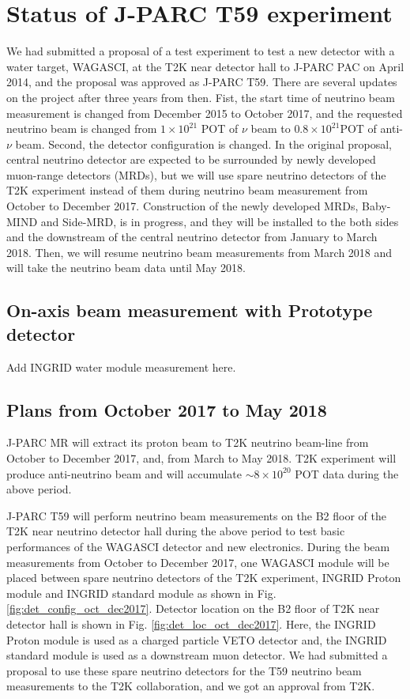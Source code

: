 \section{Status of J-PARC T59 experiment}
We had submitted a proposal of a test experiment to test a new detector with a water target, WAGASCI, at the T2K near detector hall to J-PARC PAC on April 2014, and the proposal was approved as J-PARC T59.
 There are several updates on the project after three years from then.
 Fist, the start time of neutrino beam measurement is changed from December 2015 to October 2017, and the requested neutrino beam is changed from $1\times10^{21}$ POT of $\nu$ beam to $0.8\times10^{21} $POT of anti-$\nu$ beam. 
 Second, the detector configuration is changed. In the original proposal, central neutrino detector are expected to be surrounded by newly developed muon-range detectors (MRDs), but we will use spare neutrino detectors of the T2K experiment instead of them during neutrino beam measurement from October to December 2017. Construction of the newly developed MRDs, Baby-MIND and Side-MRD, is in progress, and they will be installed to the both sides and the downstream of the central neutrino detector from January to March 2018. Then, we will resume neutrino beam measurements from March 2018 and will take the neutrino beam data until May 2018.


\subsection{On-axis beam measurement with Prototype detector}
Add INGRID water module measurement here.


\subsection{Plans from October 2017 to May 2018}
J-PARC MR will extract its proton beam to T2K neutrino beam-line from October to December 2017, and, from March to May 2018. T2K experiment will produce anti-neutrino beam and will accumulate $\sim8\times10^{20}$ POT data during the above period.


 J-PARC T59 will perform neutrino beam measurements on the B2 floor of the T2K near neutrino detector hall during the above period to test basic performances of the WAGASCI detector and new electronics. During the beam measurements from October to December 2017, one WAGASCI module will be placed between spare neutrino detectors of the T2K experiment, INGRID Proton module and INGRID standard module as shown in Fig. \ref{fig:det_config_oct_dec2017}.
Detector location on the B2 floor of T2K near detector hall is shown in Fig. \ref{fig:det_loc_oct_dec2017}. Here, the INGRID Proton module is used as a charged particle VETO detector and, the INGRID standard module is used as a downstream muon detector. 
We had submitted a proposal to use these spare neutrino detectors for the T59 neutrino beam measurements to the T2K collaboration, and we got an approval from T2K. 

